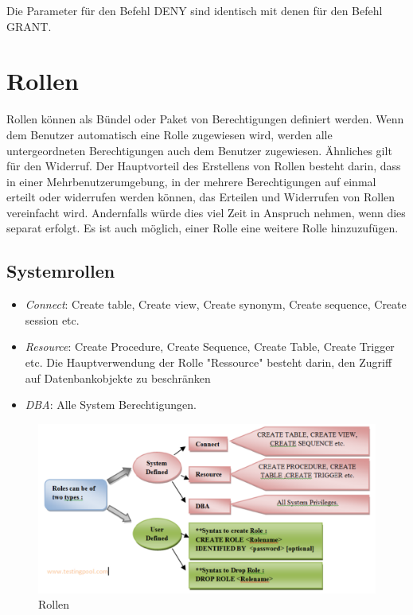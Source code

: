 Die Parameter für den Befehl DENY sind identisch mit denen für den Befehl GRANT.

\section{Rollen}
Rollen können als Bündel oder Paket von Berechtigungen definiert werden. Wenn dem Benutzer automatisch eine Rolle zugewiesen wird, werden alle untergeordneten Berechtigungen auch dem Benutzer zugewiesen. Ähnliches gilt für den Widerruf. Der Hauptvorteil des Erstellens von Rollen besteht darin, dass in einer Mehrbenutzerumgebung, in der mehrere Berechtigungen auf einmal erteilt oder widerrufen werden können, das Erteilen und Widerrufen von Rollen vereinfacht wird. Andernfalls würde dies viel Zeit in Anspruch nehmen, wenn dies separat erfolgt. Es ist auch möglich, einer Rolle eine weitere Rolle hinzuzufügen.

\subsection{Systemrollen}
\begin{itemize}
    \item \emph{Connect}: Create table, Create view, Create synonym, Create sequence, Create session etc.
    \item \emph{Resource}: Create Procedure, Create Sequence, Create Table, Create Trigger etc. Die Hauptverwendung der Rolle "Ressource" besteht darin, den Zugriff auf Datenbankobjekte zu beschränken
    \item \emph{DBA}: Alle System Berechtigungen.
\end{itemize}

\begin{figure}[h]
    \centering
    \includegraphics[width=.95\textwidth]{Content/images/dcl/rollen.png}
    \caption{Rollen}
    \label{fig:rollen}
 \end{figure}

